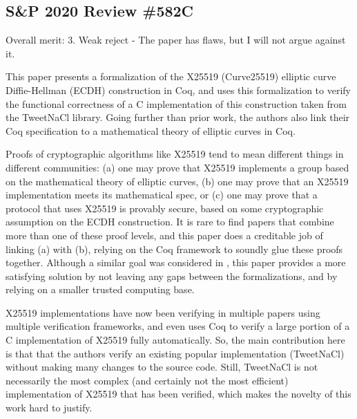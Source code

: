\subsection{S\&P 2020 Review \#582C}

Overall merit: 3. Weak reject - The paper has flaws, but I will not argue against it.


\begin{center}
\end{center}

This paper presents a formalization of the X25519 (Curve25519) elliptic curve
Diffie-Hellman  (ECDH) construction in Coq, and uses this formalization to
verify the functional correctness of a C implementation of this construction
taken from the TweetNaCl library. Going further than prior work, the authors
also link their Coq specification to a mathematical theory of elliptic curves
in Coq.


\begin{center}
\end{center}

Proofs of cryptographic algorithms like X25519 tend to mean different things in
different communities: (a) one may prove that X25519 implements a group based on
the mathematical theory of elliptic curves, (b) one may prove that an X25519
implementation meets its mathematical spec, or (c) one may prove that a protocol
that uses X25519 is provably secure, based on some cryptographic assumption on
the ECDH construction. It is rare to find papers that combine more than one of
these proof levels, and this paper does a creditable job of linking (a) with (b),
relying on the Coq framework to soundly glue these proofs together. Although a
similar goal was considered in \cite{Zinzindohoue2016AVE}, this paper provides
a more satisfying solution by not leaving any gaps between the formalizations,
and by relying on a smaller trusted computing base.


\begin{center}
\end{center}

X25519 implementations have now been verifying in multiple papers using multiple
verification frameworks, and \cite{Erbsen2016SystematicSO} even uses Coq to
verify a large portion of a C implementation of X25519 fully automatically.
So, the main contribution here is that that the authors verify an existing
popular implementation (TweetNaCl) without making many changes to the source
code. Still, TweetNaCl is not necessarily the most complex (and certainly not
the most efficient) implementation of X25519 that has been verified, which
makes the novelty of this work hard to justify.


